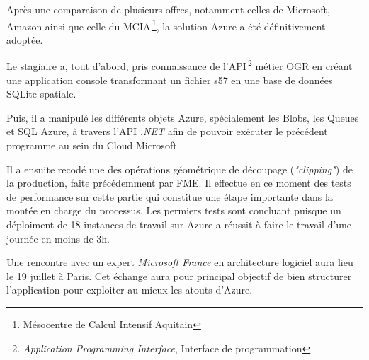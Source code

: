 


Après une comparaison de plusieurs offres, notamment celles de
Microsoft, Amazon ainsi que celle du MCIA\,\footnote{Mésocentre de
Calcul Intensif Aquitain}, la solution Azure a été définitivement
adoptée.

Le stagiaire a, tout d'abord, pris connaissance de
l'API\,\footnote{\textit{Application Programming Interface}, Interface
  de programmation} métier OGR en créant une application console
transformant un fichier s57 en une base de données SQLite spatiale.

Puis, il a manipulé les différents objets Azure, spécialement les
Blobs, les Queues et SQL Azure, à travers l'API
\textit{.NET} afin de pouvoir exécuter le précédent programme au sein
du Cloud Microsoft.

Il a ensuite recodé une des opérations géométrique de découpage
(\textit{"clipping"}) de la production, faite précédemment par FME. Il
effectue en ce moment des tests de performance sur cette partie qui
constitue une étape importante dans la montée en charge du
processus. Les permiers tests sont concluant puisque un déploiment de
18 instances de travail sur Azure a réussit à faire le travail d'une
journée en moins de 3h.

Une rencontre avec un expert \textit{Microsoft France} en architecture
logiciel aura lieu le 19 juillet à Paris. Cet échange aura pour
principal objectif de bien structurer l'application pour exploiter au
mieux les atouts d'Azure.


